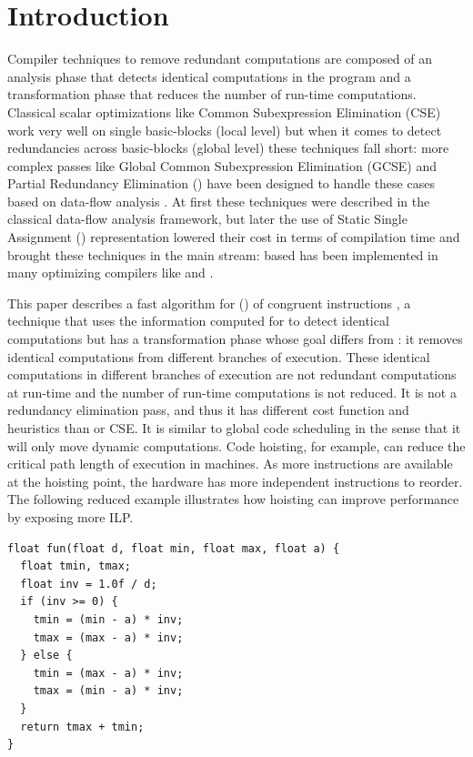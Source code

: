 \documentclass[sigplan,10pt,review,anonymous]{acmart}\settopmatter{printfolios=true,printccs=false,printacmref=false}
\begin{document}
\section{Introduction}
\label{sec:intro}
Compiler techniques to remove redundant computations are composed of an analysis
phase that detects identical computations in the program and a transformation
phase that reduces the number of run-time computations.  Classical scalar
optimizations like Common Subexpression Elimination (CSE) \cite{dragonbook} work
very well on single basic-blocks (local level) but when it comes to detect
redundancies across basic-blocks (global level) these techniques fall short:
more complex passes like Global Common Subexpression Elimination (GCSE) and
Partial Redundancy Elimination (\PRE{}) have been designed to handle these cases
based on data-flow analysis \cite{morel1979global}.  At first these techniques
were described in the classical data-flow analysis framework, but later the use
of Static Single Assignment (\SSA{}) representation lowered their cost in terms
of compilation time \cite{briggs1994effective,chow1997new,kennedy1999partial}
and brought these techniques in the main stream: \SSA{} based \PRE{} has been
implemented in many optimizing compilers like \GCC{} and \LLVM{}.

This paper describes a fast algorithm for \gcm{} (\GCM{}) of congruent
instructions \cite{briggs1997}, a technique that uses the information computed
for \PRE{} to detect identical computations but has a transformation phase whose
goal differs from \PRE{}: it removes identical computations from different
branches of execution.  These identical computations in different branches of
execution are not redundant computations at run-time and the number of run-time
computations is not reduced. It is not a redundancy elimination pass, and thus
it has different cost function and heuristics than \PRE{} or CSE. It is similar
to global code scheduling \cite{dragonbook,click1995global} in the sense that it
will only move dynamic computations. Code hoisting, for example, can reduce the
critical path length of execution in \ooo{} machines. As more instructions are
available at the hoisting point, the hardware has more independent instructions
to reorder. The following reduced example illustrates how hoisting can improve
performance by exposing more ILP.

\begin{lstlisting}
float fun(float d, float min, float max, float a) {
  float tmin, tmax;
  float inv = 1.0f / d;
  if (inv >= 0) {
    tmin = (min - a) * inv;
    tmax = (max - a) * inv;
  } else {
    tmin = (max - a) * inv;
    tmax = (min - a) * inv;
  }
  return tmax + tmin;
}
\end{lstlisting}
\end{document}
